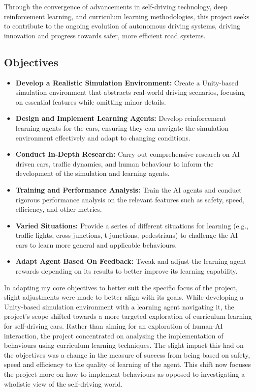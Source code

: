 \documentclass{article}
\begin{document}
Through the convergence of advancements in self-driving technology, deep reinforcement learning, and curriculum learning methodologies, this project seeks to contribute to the ongoing evolution of autonomous driving systems, driving innovation and progress towards safer, more efficient road systems.

\subsection{Objectives}
\begin{itemize}
    \item \textbf{Develop a Realistic Simulation Environment:} Create a Unity-based simulation environment that abstracts real-world driving scenarios, focusing on essential features while omitting minor details.
    
    \item \textbf{Design and Implement Learning Agents:} Develop reinforcement learning agents for the cars, ensuring they can navigate the simulation environment effectively and adapt to changing conditions.
    
    \item \textbf{Conduct In-Depth Research:} Carry out comprehensive research on AI-driven cars, traffic dynamics, and human behaviour to inform the development of the simulation and learning agents.
    
    \item \textbf{Training and Performance Analysis:} Train the AI agents and conduct rigorous performance analysis on the relevant features such as safety, speed, efficiency, and other metrics.
    
    \item \textbf{Varied Situations:} Provide a series of different situations for learning (e.g., traffic lights, cross junctions, t-junctions, pedestrians) to challenge the AI cars to learn more general and applicable behaviours.
    
    \item \textbf{Adapt Agent Based On Feedback:} Tweak and adjust the learning agent rewards depending on its results to better improve its learning capability.
    
\end{itemize}

In adapting my core objectives to better suit the specific focus of the project, slight adjustments were made to better align with its goals. While developing a Unity-based simulation environment with a learning agent navigating it, the project's scope shifted towards a more targeted exploration of curriculum learning for self-driving cars. Rather than aiming for an exploration of human-AI interaction, the project concentrated on analysing the implementation of behaviours using curriculum learning techniques. The slight impact this had on the objectives was a change in the measure of success from being based on safety, speed and efficiency to the quality of learning of the agent. This shift now focuses the project more on how to implement behaviours as opposed to investigating a wholistic view of the self-driving world.
\end{document}
